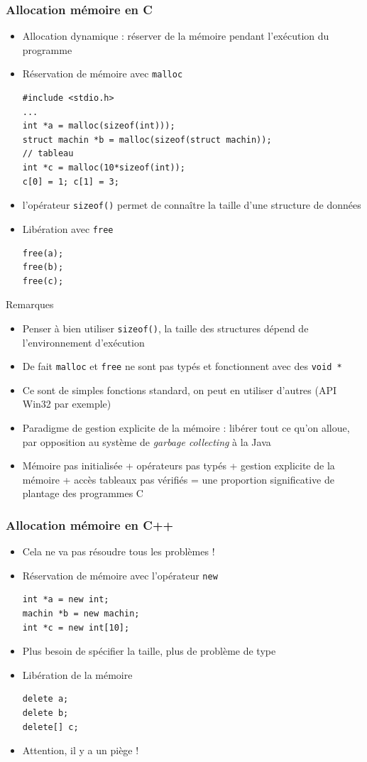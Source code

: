 \begin{frame}[fragile]
\frametitle{Allocation mémoire en C}
\begin{itemize}
\item Allocation dynamique : réserver de la mémoire pendant l'exécution du programme
\item Réservation de mémoire avec \texttt{malloc}
\begin{lstlisting}
#include <stdio.h>
...
int *a = malloc(sizeof(int)));
struct machin *b = malloc(sizeof(struct machin));
// tableau
int *c = malloc(10*sizeof(int));
c[0] = 1; c[1] = 3;
\end{lstlisting}
\item l'opérateur \texttt{sizeof()} permet de connaître la taille d'une structure de données
\item Libération avec \texttt{free}
\begin{lstlisting}
free(a);
free(b);
free(c);
\end{lstlisting}
\end{itemize}
\end{frame}

\begin{frame}{Remarques}
\begin{itemize}
\item Penser à bien utiliser \texttt{sizeof()}, la taille des structures dépend de l'environnement d'exécution
\item De fait \texttt{malloc} et \texttt{free} ne sont pas typés et fonctionnent avec des \texttt{void *}
\item Ce sont de simples fonctions standard, on peut en utiliser d'autres (API Win32 par exemple)
\item Paradigme de gestion explicite de la mémoire : libérer tout ce qu'on alloue, par opposition au système de \textit{garbage collecting} à la Java
\item Mémoire pas initialisée + opérateurs pas typés + gestion explicite de la mémoire + accès tableaux pas vérifiés = une proportion significative de plantage des programmes C
\end{itemize}
\end{frame}

\begin{frame}[fragile]
\frametitle{Allocation mémoire en C++}
\begin{itemize}
\item Cela ne va pas résoudre tous les problèmes !
\item Réservation de mémoire avec l'opérateur \texttt{new}
\begin{lstlisting}
int *a = new int;
machin *b = new machin;
int *c = new int[10];
\end{lstlisting}
\item Plus besoin de spécifier la taille, plus de problème de type
\item Libération de la mémoire
\begin{lstlisting}
delete a;
delete b;
delete[] c;
\end{lstlisting}
\item Attention, il y a un piège !
\end{itemize}
\end{frame}

